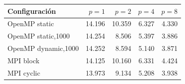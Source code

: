 \begin{tabular}{lrrrr}
\toprule
Configuraci\'on & $p=1$ & $p=2$ & $p=4$ & $p=8$ \\
\midrule
OpenMP static & 14.196 & 10.359 & 6.327 & 4.330 \\
OpenMP static,1000 & 14.254 & 8.506 & 5.397 & 3.886 \\
OpenMP dynamic,1000 & 14.252 & 8.594 & 5.140 & 3.871 \\
MPI block & 14.125 & 10.160 & 6.331 & 4.424 \\
MPI cyclic & 13.973 & 9.134 & 5.208 & 3.938 \\
\bottomrule
\end{tabular}
